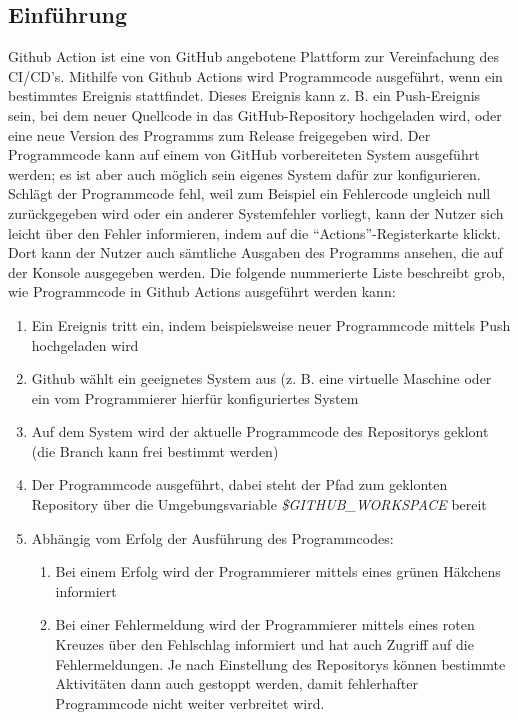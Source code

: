 \subsection{Einführung}
Github Action \cite{GithubActions} ist eine von GitHub angebotene Plattform zur Vereinfachung des \ac{CI/CD}'s. Mithilfe von  Github Actions wird Programmcode ausgeführt, wenn ein bestimmtes Ereignis stattfindet. Dieses Ereignis kann z. B. ein Push-Ereignis sein, bei dem neuer Quellcode in das GitHub-Repository hochgeladen wird, oder eine neue Version des Programms zum Release freigegeben wird. Der Programmcode kann auf einem von GitHub vorbereiteten System ausgeführt werden; es ist aber auch möglich sein eigenes System dafür zur konfigurieren. Schlägt der Programmcode fehl, weil zum Beispiel ein Fehlercode ungleich null zurückgegeben wird oder ein anderer Systemfehler vorliegt, kann der Nutzer sich leicht über den Fehler informieren, indem auf die \enquote{Actions}-Registerkarte klickt. Dort kann der Nutzer auch sämtliche Ausgaben des Programms ansehen, die auf der Konsole ausgegeben werden. Die folgende nummerierte Liste beschreibt grob, wie Programmcode in Github Actions ausgeführt werden kann:
\begin{enumerate}
    \item Ein Ereignis tritt ein, indem beispielsweise neuer Programmcode mittels Push hochgeladen wird 
    \item Github wählt ein geeignetes System aus (z. B. eine virtuelle Maschine oder ein vom Programmierer hierfür konfiguriertes System
    \item Auf dem System wird der aktuelle Programmcode des Repositorys geklont (die Branch kann frei bestimmt werden) 
    \item Der Programmcode ausgeführt, dabei steht der Pfad zum geklonten Repository über die Umgebungsvariable \textit{\$GITHUB\_WORKSPACE} bereit
    \item Abhängig vom Erfolg der Ausführung des Programmcodes:
    \begin{enumerate}
        \item Bei einem Erfolg wird der Programmierer mittels eines grünen Häkchens informiert
        \item Bei einer Fehlermeldung wird der Programmierer mittels eines roten Kreuzes über den Fehlschlag informiert und hat auch Zugriff auf die Fehlermeldungen. Je nach Einstellung des Repositorys können bestimmte Aktivitäten dann auch gestoppt werden, damit fehlerhafter Programmcode nicht weiter verbreitet wird. 
    \end{enumerate}
\end{enumerate}


